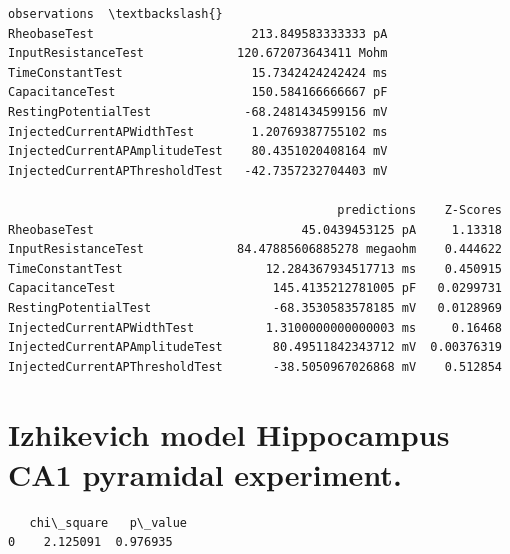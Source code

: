             \begin{tcolorbox}[breakable, size=fbox, boxrule=.5pt, pad at break*=1mm, opacityfill=0]
\begin{Verbatim}[commandchars=\\\{\}]
                                         observations  \textbackslash{}
RheobaseTest                      213.849583333333 pA
InputResistanceTest             120.672073643411 Mohm
TimeConstantTest                  15.7342424242424 ms
CapacitanceTest                   150.584166666667 pF
RestingPotentialTest             -68.2481434599156 mV
InjectedCurrentAPWidthTest        1.20769387755102 ms
InjectedCurrentAPAmplitudeTest    80.4351020408164 mV
InjectedCurrentAPThresholdTest   -42.7357232704403 mV

                                              predictions    Z-Scores
RheobaseTest                             45.0439453125 pA     1.13318
InputResistanceTest             84.47885606885278 megaohm    0.444622
TimeConstantTest                    12.284367934517713 ms    0.450915
CapacitanceTest                      145.4135212781005 pF   0.0299731
RestingPotentialTest                 -68.3530583578185 mV   0.0128969
InjectedCurrentAPWidthTest          1.3100000000000003 ms     0.16468
InjectedCurrentAPAmplitudeTest       80.49511842343712 mV  0.00376319
InjectedCurrentAPThresholdTest       -38.5050967026868 mV    0.512854
\end{Verbatim}
\end{tcolorbox}
        
    \hypertarget{izhikevich-model-hippocampus-ca1-pyramidal-experiment.}{%
\section{Izhikevich model Hippocampus CA1 pyramidal
experiment.}\label{izhikevich-model-hippocampus-ca1-pyramidal-experiment.}}

            \begin{tcolorbox}[breakable, size=fbox, boxrule=.5pt, pad at break*=1mm, opacityfill=0]
\begin{Verbatim}
   chi\_square   p\_value
0    2.125091  0.976935
\end{Verbatim}
\end{tcolorbox}
        
